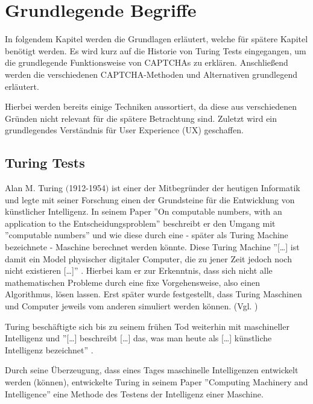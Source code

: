 \chapter{Grundlegende Begriffe}
\label{ch:basics}
In folgendem Kapitel werden die Grundlagen erläutert, welche für spätere Kapitel benötigt werden. 
Es wird kurz auf die Historie von Turing Tests eingegangen, um die grundlegende Funktionsweise von CAPTCHAs zu erklären.
Anschließend werden die verschiedenen CAPTCHA-Methoden und Alternativen grundlegend erläutert. 

Hierbei werden bereits einige Techniken aussortiert, da diese aus verschiedenen Gründen nicht relevant für die spätere Betrachtung sind.
Zuletzt wird ein grundlegendes Verständnis für User Experience (UX) geschaffen.

\section{Turing Tests}
\label{ch:basics:turing}
Alan M. Turing $($1912-1954$)$ ist einer der Mitbegründer der heutigen Informatik 
und legte mit seiner Forschung einen der Grundsteine für die Entwicklung von künstlicher Intelligenz. 
In seinem Paper ''On computable numbers, with an application to the Entscheidungsproblem'' \cite{turing} 
beschreibt er den Umgang mit ''computable numbers'' und wie diese durch eine - später als Turing Machine bezeichnete - Maschine berechnet werden könnte.
Diese Turing Machine ''[\dots] ist damit ein Model physischer digitaler Computer, die zu jener Zeit jedoch noch nicht existieren [\dots]'' \cite[p.4]{pallay2020turing}.
Hierbei kam er zur Erkenntnis, dass sich nicht alle mathematischen Probleme durch eine fixe Vorgehensweise, also einen Algorithmus, lösen lassen. 
Erst später wurde festgestellt, dass Turing Maschinen und Computer jeweils vom anderen simuliert werden können. (Vgl.\cite[p.647]{geniusofturing} \cite[p.4]{pallay2020turing}) %

Turing beschäftigte sich bis zu seinem frühen Tod weiterhin mit maschineller Intelligenz 
und ''[\dots] beschreibt [\dots] das, was man heute als [\dots] künstliche Intelligenz bezeichnet'' \cite[p.10]{pallay2020turing}.

Durch seine Überzeugung, dass eines Tages maschinelle Intelligenzen entwickelt werden (können), 
entwickelte Turing in seinem Paper ''Computing Machinery and Intelligence'' \cite[p.23ff]{turing2009computing} 
eine Methode des Testens der Intelligenz einer Maschine. 

